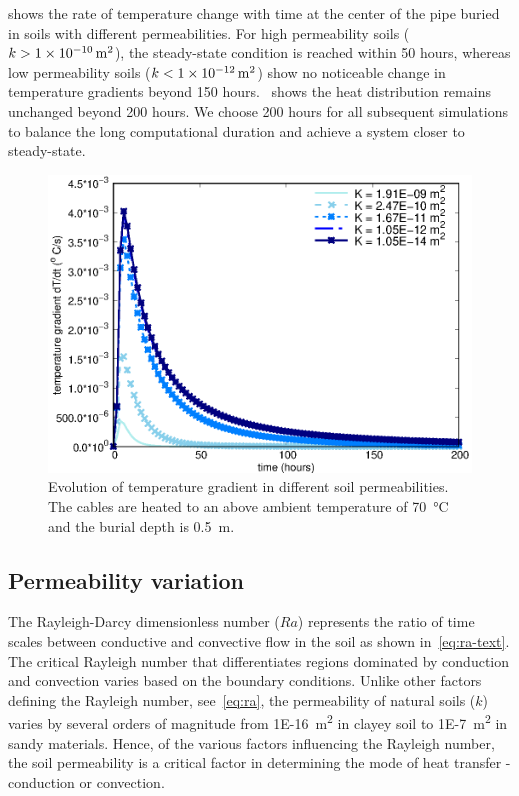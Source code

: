 \documentclass[Journal,letterpaper,InsideFigs]{ascelike-new}
\begin{document}
 shows the rate of temperature change with time at the center of the pipe buried in soils with different permeabilities. For high permeability soils ($k > \SI{1E-10}{\meter\squared}$), the steady-state condition is reached within 50 hours, whereas low permeability soils ($k < \SI{1E-12}{\meter\squared}$) show no noticeable change in temperature gradients beyond 150 hours.~ shows the heat distribution remains unchanged beyond 200 hours. We choose 200 hours for all subsequent simulations to balance the long computational duration and achieve a system closer to steady-state. 

\begin{figure}
    \centering
    \includegraphics{figs/dTdt.eps}
    \caption{Evolution of temperature gradient in different soil permeabilities. The cables are heated to an above ambient temperature of \SI{70}{\celsius} and the burial depth is \SI{0.5}{\meter}.}
    \label{fig:dTdt}
\end{figure}

\subsection*{Permeability variation}
The Rayleigh-Darcy dimensionless number ($Ra$) represents the ratio of time scales between conductive and convective flow in the soil as shown in~\cref{eq:ra-text}. The critical Rayleigh number that differentiates regions dominated by conduction and convection varies based on the boundary conditions. Unlike other factors defining the Rayleigh number, see~\cref{eq:ra}, the permeability of natural soils ($k$) varies by several orders of magnitude from \SI{1E-16}{\meter\squared} in clayey soil to \SI{1E-7}{\meter\squared} in sandy materials. Hence, of the various factors influencing the Rayleigh number, the soil permeability is a critical factor in determining the mode of heat transfer - conduction or convection.
\end{document}
